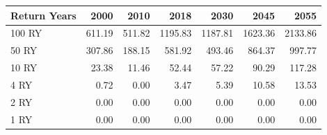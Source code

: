 \begin{table}[htbp]
\centering
{}
\label{tab:return_years_lao}
\small
\begin{tabular}{lrrrrrr}
\toprule
\textbf{Return Years} & \textbf{2000} & \textbf{2010} & \textbf{2018} & \textbf{2030} & \textbf{2045} & \textbf{2055} \\
\midrule
100 RY & 611.19 & 511.82 & 1195.83 & 1187.81 & 1623.36 & 2133.86 \\
50 RY & 307.86 & 188.15 & 581.92 & 493.46 & 864.37 & 997.77 \\
10 RY & 23.38 & 11.46 & 52.44 & 57.22 & 90.29 & 117.28 \\
4 RY & 0.72 & 0.00 & 3.47 & 5.39 & 10.58 & 13.53 \\
2 RY & 0.00 & 0.00 & 0.00 & 0.00 & 0.00 & 0.00 \\
1 RY & 0.00 & 0.00 & 0.00 & 0.00 & 0.00 & 0.00 \\
\bottomrule
\end{tabular}
\end{table}
